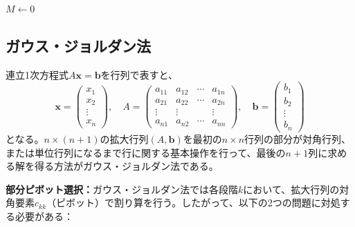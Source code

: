 \documentclass[12pt,a4paper]{ltjsreport}
\begin{document}
\begin{algorithm}[H]
\caption{SOR法}
\BlankLine
$M \leftarrow 0$\;
\end{algorithm}

\subsection{ガウス・ジョルダン法}

連立1次方程式$A\boldsymbol{x} = \boldsymbol{b}$を行列で表すと、
\begin{equation}
\boldsymbol{x} = \begin{pmatrix} x_1 \\ x_2 \\ \vdots \\ x_n \end{pmatrix}, \quad
A = \begin{pmatrix} 
a_{11} & a_{12} & \cdots & a_{1n} \\
a_{21} & a_{22} & \cdots & a_{2n} \\
\vdots & \vdots & & \vdots \\
a_{n1} & a_{n2} & \cdots & a_{nn}
\end{pmatrix}, \quad
\boldsymbol{b} = \begin{pmatrix} b_1 \\ b_2 \\ \vdots \\ b_n \end{pmatrix}
\end{equation}
となる。$n \times (n+1)$の拡大行列$(A, \boldsymbol{b})$を最初の$n \times n$行列の部分が対角行列、または単位行列になるまで行に関する基本操作を行って、最後の$n+1$列に求める解を得る方法がガウス・ジョルダン法である。

\textbf{部分ピボット選択：}ガウス・ジョルダン法では各段階$k$において、拡大行列の対角要素$c_{kk}$（ピボット）で割り算を行う。したがって、以下の2つの問題に対処する必要がある：
\end{document}
